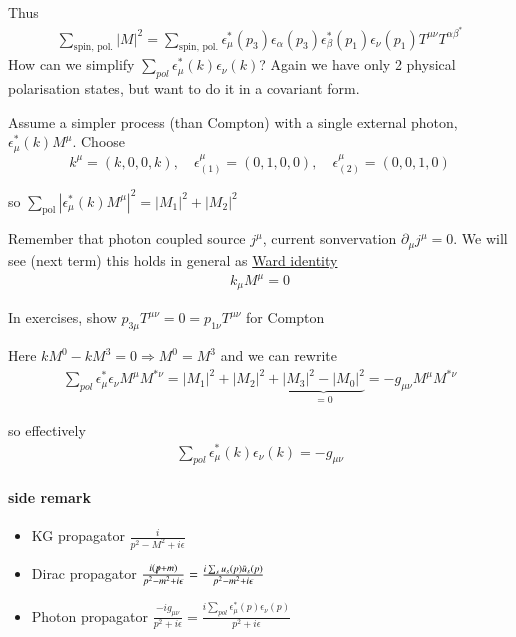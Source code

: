 Thus 
\begin{align*}
	\sum_{\text{spin, pol.}} |M|^2 =  \sum_{\text{spin, pol.}} \epsilon^*_\mu (p_3) \epsilon_\alpha (p_3) \epsilon^*_\beta (p_1) \epsilon_\nu (p_1) T^{\mu\nu} T^{\alpha\beta^*}
\end{align*}
How can we simplify $\sum_{pol} \epsilon_\mu^*(k) \epsilon_\nu(k)$? Again we have only 2 physical polarisation states, but want to do it in a covariant form.

Assume a simpler process (than Compton) with a single external photon, $\epsilon^*_\mu (k) M^\mu$. Choose $$k^\mu = (k,0,0,k),\quad \epsilon_{(1)}^\mu = (0,1,0,0),\quad \epsilon_{(2)}^\mu = (0,0, 1,0)$$

so $\sum_\text{pol}|\epsilon_\mu^*(k) M^\mu|^2 = |M_1|^2 + |M_2|^2$

Remember that photon coupled source $j^\mu$, current sonvervation $\partial_\mu j^\mu = 0$. We will see (next term) this holds in general as \underline{Ward identity}
\begin{align}
	k_\mu M^\mu = 0
\end{align}

In exercises, show $p_{3 \mu} T^{\mu\nu} = 0 = p_{1\nu}T^{\mu\nu}$ for Compton

Here $kM^0 - k M^3 = 0 \Rightarrow M^0 = M^3$ and we can rewrite 
\begin{align*}
	\sum_{pol} \epsilon_\mu^* \epsilon_\nu M^\mu M^{*\nu} = |M_1|^2 + |M_2|^2 + \underbrace{|M_3|^2 - |M_0|^2}_{=0} = -g_{\mu\nu} M^\mu M^{*\nu}
\end{align*}

so effectively
\begin{align}
	\sum_{pol} \epsilon^*_\mu (k) \epsilon_\nu (k) = -g_{\mu\nu}
\end{align}

\paragraph{side remark}
\begin{itemize}
	\item KG propagator $\frac{i}{p^2 - M^2 + i\epsilon}$
	\item Dirac propagator $\frac{i(\slashed{p}+m)}{p^2 - m^2 + i\epsilon} = \frac{i \sum_s u_s(p) \bar{u}_s(p)}{p^2 - m^2 + i\epsilon}$
	\item Photon propagator $\frac{-ig_{\mu\nu}}{p^2 + i\epsilon} = \frac{i\sum_{pol}\epsilon^*_\mu (p)\epsilon_\nu(p)}{p^2+i\epsilon}$
\end{itemize}

